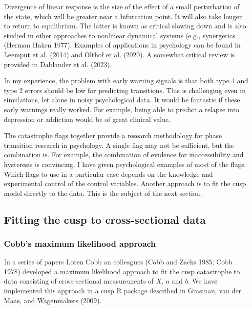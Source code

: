 \documentclass[
  a4paper,
  DIV=11,
  numbers=noendperiod,
  oneside]{scrreprt}
\begin{document}
Divergence of linear response is the size of the effect of a small
perturbation of the state, which will be greater near a bifurcation
point. It will also take longer to return to equilibrium. The latter is
known as critical slowing down and is also studied in other approaches
to nonlinear dynamical systems (e.g., synergetics (Herman Haken 1977).
Examples of applications in psychology can be found in Leemput et al.
(2014) and Olthof et al. (2020). A somewhat critical review is provided
in Dablander et al. (2023).

In my experience, the problem with early warning signals is that both
type 1 and type 2 errors should be low for predicting transitions. This
is challenging even in simulations, let alone in noisy psychological
data. It would be fantastic if these early warnings really worked. For
example, being able to predict a relapse into depression or addiction
would be of great clinical value.

The catastrophe flags together provide a research methodology for phase
transition research in psychology. A single flag may not be sufficient,
but the combination is. For example, the combination of evidence for
inaccessibility and hysteresis is convincing. I have given psychological
examples of most of the flags. Which flags to use in a particular case
depends on the knowledge and experimental control of the control
variables. Another approach is to fit the cusp model directly to the
data. This is the subject of the next section.

\hypertarget{sec-Fitting-the-cusp-to-crosssectional-data}{%
\subsection{Fitting the cusp to cross-sectional
data}\label{sec-Fitting-the-cusp-to-crosssectional-data}}

\hypertarget{sec-Cobbs-maximum-likelihood-approach}{%
\subsubsection{Cobb's maximum likelihood
approach}\label{sec-Cobbs-maximum-likelihood-approach}}

In a series of papers Loren Cobb an colleagues (Cobb and Zacks 1985;
Cobb 1978) developed a maximum likelihood approach to fit the cusp
catastrophe to data consisting of cross-sectional measurements of \(X\),
\(a\) and \(b\). We have implemented this approach in a cusp R package
described in Grasman, van der Maas, and Wagenmakers (2009).
\end{document}
